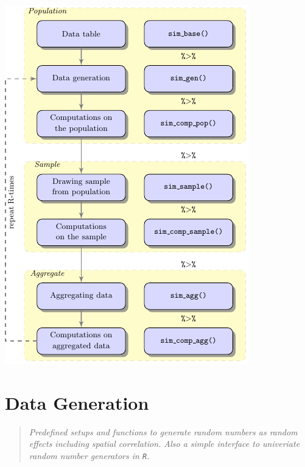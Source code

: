 \documentclass[a0,portrait]{a0poster}\usepackage[]{graphicx}\usepackage[]{color}
\newcommand{\mysec}[1]{\color{Black}\section*{#1}\color{DarkSlateGray}}
\newcommand{\code}[1]{\texttt{#1}}
\begin{document}
\begin{multicols}{2}
\begin{multicols}{2}[\setlength{\columnseprule}{0pt}]
\includegraphics[width=\linewidth]{figs/flowdiagram}

\end{multicols}


\mysec{Data Generation}

\begin{verse}
\textit{Predefined setups and functions to generate random numbers as \textit{random effects} including spatial correlation. Also a simple interface to univeriate random number generators in \code{R}.}
\end{verse}



\end{multicols}
\end{document}
